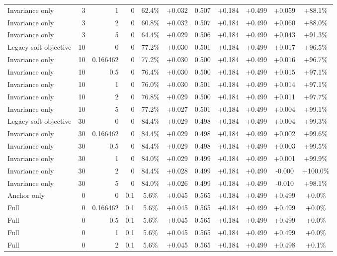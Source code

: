 \begin{table}[htbp]
\begin{tabular}{lrrrccccccc}
Invariance only & 3 & 1 & 0 & 62.4\% & +0.032 & 0.507 & +0.184 & +0.499 & +0.059 & +88.1\% \\
Invariance only & 3 & 2 & 0 & 60.8\% & +0.032 & 0.507 & +0.184 & +0.499 & +0.060 & +88.0\% \\
Invariance only & 3 & 5 & 0 & 64.4\% & +0.029 & 0.506 & +0.184 & +0.499 & +0.043 & +91.3\% \\
Legacy soft objective & 10 & 0 & 0 & 77.2\% & +0.030 & 0.501 & +0.184 & +0.499 & +0.017 & +96.5\% \\
Invariance only & 10 & 0.166462 & 0 & 77.2\% & +0.030 & 0.500 & +0.184 & +0.499 & +0.016 & +96.7\% \\
Invariance only & 10 & 0.5 & 0 & 76.4\% & +0.030 & 0.500 & +0.184 & +0.499 & +0.015 & +97.1\% \\
Invariance only & 10 & 1 & 0 & 76.0\% & +0.030 & 0.501 & +0.184 & +0.499 & +0.014 & +97.1\% \\
Invariance only & 10 & 2 & 0 & 76.8\% & +0.029 & 0.500 & +0.184 & +0.499 & +0.011 & +97.7\% \\
Invariance only & 10 & 5 & 0 & 77.2\% & +0.027 & 0.501 & +0.184 & +0.499 & +0.004 & +99.1\% \\
Legacy soft objective & 30 & 0 & 0 & 84.4\% & +0.029 & 0.498 & +0.184 & +0.499 & +0.004 & +99.3\% \\
Invariance only & 30 & 0.166462 & 0 & 84.4\% & +0.029 & 0.498 & +0.184 & +0.499 & +0.002 & +99.6\% \\
Invariance only & 30 & 0.5 & 0 & 84.4\% & +0.029 & 0.498 & +0.184 & +0.499 & +0.003 & +99.5\% \\
Invariance only & 30 & 1 & 0 & 84.0\% & +0.029 & 0.499 & +0.184 & +0.499 & +0.001 & +99.9\% \\
Invariance only & 30 & 2 & 0 & 84.4\% & +0.028 & 0.499 & +0.184 & +0.499 & -0.000 & +100.0\% \\
Invariance only & 30 & 5 & 0 & 84.0\% & +0.026 & 0.499 & +0.184 & +0.499 & -0.010 & +98.1\% \\
Anchor only & 0 & 0 & 0.1 & 5.6\% & +0.045 & 0.565 & +0.184 & +0.499 & +0.499 & +0.0\% \\
Full & 0 & 0.166462 & 0.1 & 5.6\% & +0.045 & 0.565 & +0.184 & +0.499 & +0.499 & +0.0\% \\
Full & 0 & 0.5 & 0.1 & 5.6\% & +0.045 & 0.565 & +0.184 & +0.499 & +0.499 & +0.0\% \\
Full & 0 & 1 & 0.1 & 5.6\% & +0.045 & 0.565 & +0.184 & +0.499 & +0.499 & +0.0\% \\
Full & 0 & 2 & 0.1 & 5.6\% & +0.045 & 0.565 & +0.184 & +0.499 & +0.498 & +0.1\% \\

\end{tabular}
\end{table}
